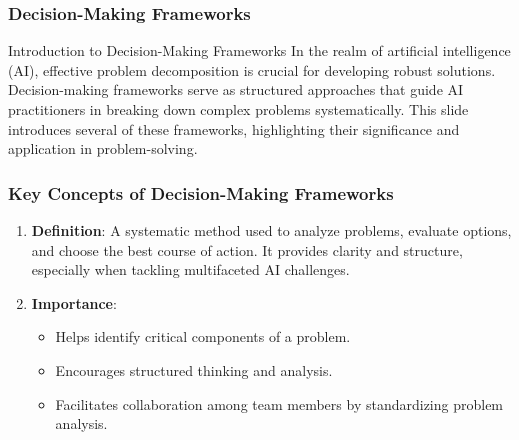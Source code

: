 \documentclass[aspectratio=169]{beamer}
\begin{document}
\begin{frame}[fragile]
    \frametitle{Decision-Making Frameworks}
    \begin{block}{Introduction to Decision-Making Frameworks}
        In the realm of artificial intelligence (AI), effective problem decomposition is crucial for developing robust solutions. 
        Decision-making frameworks serve as structured approaches that guide AI practitioners in breaking down complex problems systematically. 
        This slide introduces several of these frameworks, highlighting their significance and application in problem-solving.
    \end{block}
\end{frame}

\begin{frame}[fragile]
    \frametitle{Key Concepts of Decision-Making Frameworks}
    \begin{enumerate}
        \item \textbf{Definition}: A systematic method used to analyze problems, evaluate options, and choose the best course of action. It provides clarity and structure, especially when tackling multifaceted AI challenges.
        
        \item \textbf{Importance}:
        \begin{itemize}
            \item Helps identify critical components of a problem.
            \item Encourages structured thinking and analysis.
            \item Facilitates collaboration among team members by standardizing problem analysis.
        \end{itemize}
    \end{enumerate}
\end{frame}
\end{document}
